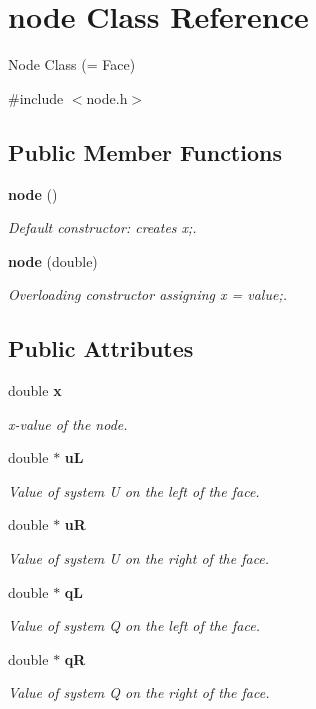 \section{node Class Reference}
\label{classnode}


Node Class (= Face)  




{\ttfamily \#include $<$node.\-h$>$}

\subsection*{Public Member Functions}
\begin{DoxyCompactItemize}
\item 
{\bf node} ()
\begin{DoxyCompactList}\small\item\em Default constructor\-: creates x;. \end{DoxyCompactList}\item 
{\bf node} (double)
\begin{DoxyCompactList}\small\item\em Overloading constructor assigning x = value;. \end{DoxyCompactList}\end{DoxyCompactItemize}
\subsection*{Public Attributes}
\begin{DoxyCompactItemize}
\item 
double {\bf x}
\begin{DoxyCompactList}\small\item\em x-\/value of the node. \end{DoxyCompactList}\item 
double $\ast$ {\bf u\-L}
\begin{DoxyCompactList}\small\item\em Value of system U on the left of the face. \end{DoxyCompactList}\item 
double $\ast$ {\bf u\-R}
\begin{DoxyCompactList}\small\item\em Value of system U on the right of the face. \end{DoxyCompactList}\item 
double $\ast$ {\bf q\-L}
\begin{DoxyCompactList}\small\item\em Value of system Q on the left of the face. \end{DoxyCompactList}\item 
double $\ast$ {\bf q\-R}
\begin{DoxyCompactList}\small\item\em Value of system Q on the right of the face. \end{DoxyCompactList}\end{DoxyCompactItemize}


